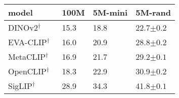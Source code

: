\small
\begin{tabular}{lYYY}
\toprule
\textbf{model} & \textbf{100M} & \textbf{5M-mini} & \textbf{5M-rand} \\
\midrule
DINOv2$^\dagger$~\cite{odm+24}              & 15.3 & 18.8 & 22.7\scriptsize{$\pm0.2$} \\
EVA-CLIP$^\dagger$~\cite{evaclip}           & 16.0 & 20.9 & 28.8\scriptsize{$\pm0.2$} \\
MetaCLIP$^\dagger$~\cite{metaclip}          & 16.9 & 21.7 & 29.2\scriptsize{$\pm0.1$} \\
OpenCLIP$^\dagger$~\cite{iww+21,convnext}   & 18.3 & 22.9 & 30.9\scriptsize{$\pm0.2$} \\
SigLIP$^\dagger$~\cite{siglip}              & 28.9 & 34.3 & 41.8\scriptsize{$\pm0.1$} \\ 
\bottomrule
\end{tabular}